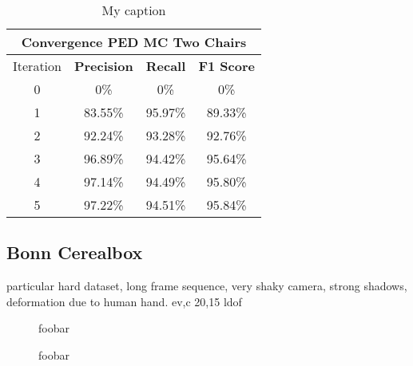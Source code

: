 \begin{table}[H]
\centering
\begin{tabular}{|c|c|c|c|}
\hline
\multicolumn{4}{|c|}{Convergence PED MC Two Chairs}                        \\ \hline
Iteration & \textbf{Precision} & \textbf{Recall} & \textbf{F1 Score} \\ \hline
0 & 0\%   & 0\%     & 0\%  \\ \hline
1 & 83.55\%   & 95.97\%     & 89.33\%  \\ \hline
2 & 92.24\%   & 93.28\%     & 92.76\%  \\ \hline 
3 & 96.89\%   & 94.42\%     & 95.64\%  \\ \hline
4 & 97.14\%   & 94.49\%     & 95.80\%  \\ \hline
5 & 97.22\%   & 94.51\%     & 95.84\%  \\ \hline               
\end{tabular}
\caption[Convergence PED MC]{My caption}
\label{tab:two_chairs_ped_mc_iterations}
\end{table}

\subsection{Bonn Cerealbox}
particular hard dataset, long frame sequence, very shaky camera, strong shadows, deformation due to human hand.
ev,c
20,15
ldof

\begin{figure}[H]
\begin{center}
\end{center}
\caption[Bonn Cerealbox Dataset]{foobar}
\label{fig:bonn_cerealbox_ds}
\end{figure}

\begin{figure}[H]
\begin{center}
\end{center}
\caption[Bonn Cerealbox Segmentations]{foobar}
\label{fig:bonn_cerealbox_segmentations_mc_methods}
\end{figure}


